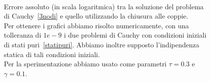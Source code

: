 \begin{figure}[!htb]
	\centering
	\subfloat[][Nodo 1.]
	{\resizebox{0.45\textwidth}{!}{}}
 \quad 
\subfloat[][Nodo 2.]
{\resizebox{0.45\textwidth}{!}{ }}
\\
\subfloat[][Nodo 3.]
{\resizebox{0.45\textwidth}{!}
{}}
\caption[Errori assoluti relativi al grafo~\ref{fig::3nodi} tra modello esatto e chiuso alle coppie] {Errore assoluto (in scala logaritmica) tra la soluzione del problema di Cauchy~\eqref{3nodi} e quello utilizzando la chiusura alle coppie.\\
Per ottenere i grafici abbiamo risolto numericamente, con una tolleranza di $1e-9$ i due problemi di Cauchy con condizioni iniziali di stati puri~\eqref{statipuri}. Abbiamo inoltre supposto l'indipendenza statica di tali condizioni iniziali.\\
Per la sperimentazione abbiamo usato come parametri $\tau = 0.3$ e $\gamma = 0.1$. }
\label{fig::errori3nodiPair}
\end{figure}

